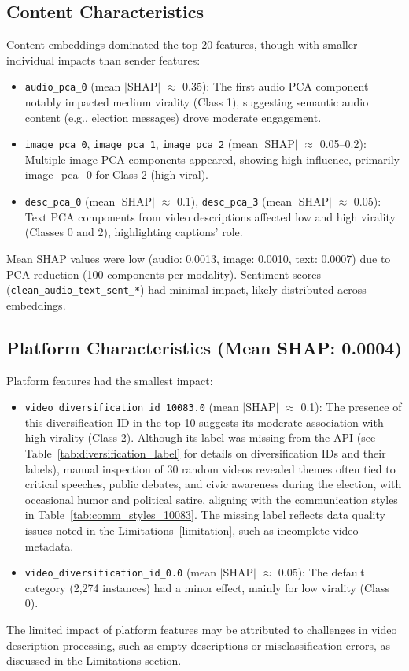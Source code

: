 \documentclass[12pt,a4paper]{report}
\begin{document}
\subsection{Content Characteristics}
Content embeddings dominated the top 20 features, though with smaller individual impacts than sender features:
\begin{itemize}
    \item \texttt{audio\_pca\_0} (mean $|$SHAP$|$ $\approx$ 0.35): The first audio PCA component notably impacted medium virality (Class 1), suggesting semantic audio content (e.g., election messages) drove moderate engagement.
    \item \texttt{image\_pca\_0}, \texttt{image\_pca\_1}, \texttt{image\_pca\_2} (mean $|$SHAP$|$ $\approx$ 0.05--0.2): Multiple image PCA components appeared, showing high influence, primarily image\_pca\_0 for Class 2 (high-viral).
    \item \texttt{desc\_pca\_0} (mean $|$SHAP$|$ $\approx$ 0.1), \texttt{desc\_pca\_3} (mean $|$SHAP$|$ $\approx$ 0.05): Text PCA components from video descriptions affected low and high virality (Classes 0 and 2), highlighting captions’ role.
\end{itemize}
Mean SHAP values were low (audio: 0.0013, image: 0.0010, text: 0.0007) due to PCA reduction (100 components per modality). Sentiment scores (\texttt{clean\_audio\_text\_sent\_*}) had minimal impact, likely distributed across embeddings.
\newpage
\subsection{Platform Characteristics (Mean SHAP: 0.0004)}
Platform features had the smallest impact:
\begin{itemize}
    \item \texttt{video\_diversification\_id\_10083.0} (mean $|$SHAP$|$ $\approx$ 0.1): The presence of this diversification ID in the top 10 suggests its moderate association with high virality (Class 2). Although its label was missing from the API (see Table~\ref{tab:diversification_label} for details on diversification IDs and their labels), manual inspection of 30 random videos revealed themes often tied to critical speeches, public debates, and civic awareness during the election, with occasional humor and political satire, aligning with the communication styles in Table~\ref{tab:comm_styles_10083}. The missing label reflects data quality issues noted in the Limitations~\ref{limitation}, such as incomplete video metadata.
    \item \texttt{video\_diversification\_id\_0.0} (mean $|$SHAP$|$ $\approx$ 0.05): The default category (2,274 instances) had a minor effect, mainly for low virality (Class 0).
\end{itemize}
The limited impact of platform features may be attributed to challenges in video description processing, such as empty descriptions or misclassification errors, as discussed in the Limitations section.
\end{document}
